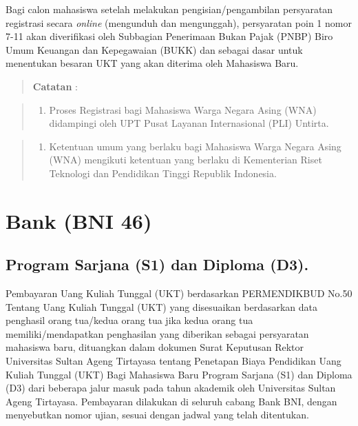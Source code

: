 \documentclass[
]{book}
\providecommand{\tightlist}{%
  \setlength{\itemsep}{0pt}\setlength{\parskip}{0pt}}
\begin{document}
Bagi calon mahasiswa setelah melakukan pengisian/pengambilan persyaratan registrasi secara \emph{online} (mengunduh dan mengunggah), persyaratan poin 1 nomor 7-11 akan diverifikasi oleh Subbagian Penerimaan Bukan Pajak (PNBP) Biro Umum Keuangan dan Kepegawaian (BUKK) dan sebagai dasar untuk menentukan besaran UKT yang akan diterima oleh Mahasiswa Baru.

\begin{quote}
\textbf{Catatan} :
\end{quote}

\begin{quote}
\begin{enumerate}
\def\labelenumi{\arabic{enumi}.}
\tightlist
\item
  Proses Registrasi bagi Mahasiswa Warga Negara Asing (WNA) didampingi oleh UPT Pusat Layanan Internasional (PLI) Untirta.
\end{enumerate}
\end{quote}

\begin{quote}
\begin{enumerate}
\def\labelenumi{\arabic{enumi}.}
\setcounter{enumi}{1}
\tightlist
\item
  Ketentuan umum yang berlaku bagi Mahasiswa Warga Negara Asing (WNA) mengikuti ketentuan yang berlaku di Kementerian Riset Teknologi dan Pendidikan Tinggi Republik Indonesia.
\end{enumerate}
\end{quote}

\hypertarget{bank-bni-46}{%
\section{Bank (BNI 46)}\label{bank-bni-46}}

\hypertarget{program-sarjana-s1-dan-diploma-d3.}{%
\subsection{Program Sarjana (S1) dan Diploma (D3).}\label{program-sarjana-s1-dan-diploma-d3.}}

Pembayaran Uang Kuliah Tunggal (UKT) berdasarkan PERMENDIKBUD No.50 Tentang Uang Kuliah Tunggal (UKT) yang disesuaikan berdasarkan data penghasil orang tua/kedua orang tua jika kedua orang tua memiliki/mendapatkan penghasilan yang diberikan sebagai persyaratan mahasiswa baru, dituangkan dalam dokumen Surat Keputusan Rektor Universitas Sultan Ageng Tirtayasa tentang Penetapan Biaya Pendidikan Uang Kuliah Tunggal (UKT) Bagi Mahasiswa Baru Program Sarjana (S1) dan Diploma (D3) dari beberapa jalur masuk pada tahun akademik oleh Universitas Sultan Ageng Tirtayasa. Pembayaran dilakukan di seluruh cabang Bank BNI, dengan menyebutkan nomor ujian, sesuai dengan jadwal yang telah ditentukan.
\end{document}

